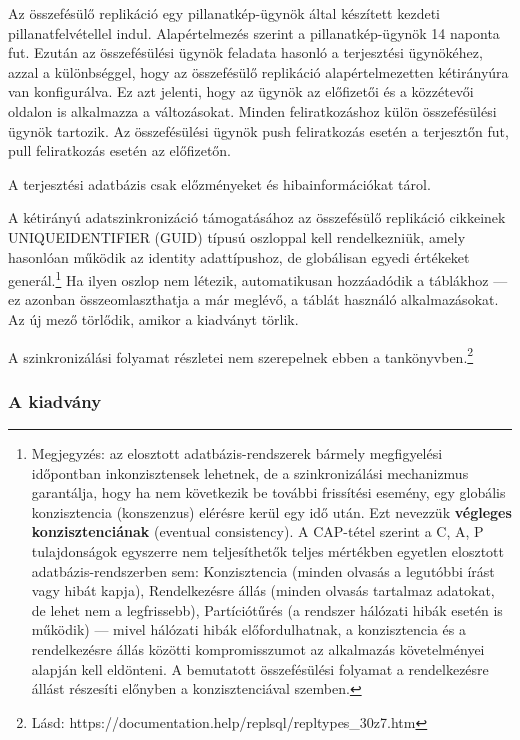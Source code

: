 \documentclass[
  magyar,
]{article}
\begin{document}
Az összefésülő replikáció egy pillanatkép-ügynök által készített kezdeti
pillanatfelvétellel indul. Alapértelmezés szerint a pillanatkép-ügynök
14 naponta fut. Ezután az összefésülési ügynök feladata hasonló a
terjesztési ügynökéhez, azzal a különbséggel, hogy az összefésülő
replikáció alapértelmezetten kétirányúra van konfigurálva. Ez azt
jelenti, hogy az ügynök az előfizetői és a közzétevői oldalon is
alkalmazza a változásokat. Minden feliratkozáshoz külön összefésülési
ügynök tartozik. Az összefésülési ügynök push feliratkozás esetén a
terjesztőn fut, pull feliratkozás esetén az előfizetőn.

A terjesztési adatbázis csak előzményeket és hibainformációkat tárol.

A kétirányú adatszinkronizáció támogatásához az összefésülő replikáció
cikkeinek UNIQUEIDENTIFIER (GUID) típusú oszloppal kell rendelkezniük,
amely hasonlóan működik az identity adattípushoz, de globálisan egyedi
értékeket generál.\footnote{Megjegyzés: az elosztott
  adatbázis-rendszerek bármely megfigyelési időpontban inkonzisztensek
  lehetnek, de a szinkronizálási mechanizmus garantálja, hogy ha nem
  következik be további frissítési esemény, egy globális konzisztencia
  (konszenzus) elérésre kerül egy idő után. Ezt nevezzük
  \textbf{végleges konzisztenciának} (eventual consistency). A CAP-tétel
  szerint a C, A, P tulajdonságok egyszerre nem teljesíthetők teljes
  mértékben egyetlen elosztott adatbázis-rendszerben sem: Konzisztencia
  (minden olvasás a legutóbbi írást vagy hibát kapja), Rendelkezésre
  állás (minden olvasás tartalmaz adatokat, de lehet nem a legfrissebb),
  Partíciótűrés (a rendszer hálózati hibák esetén is működik) --- mivel
  hálózati hibák előfordulhatnak, a konzisztencia és a rendelkezésre
  állás közötti kompromisszumot az alkalmazás követelményei alapján kell
  eldönteni. A bemutatott összefésülési folyamat a rendelkezésre állást
  részesíti előnyben a konzisztenciával szemben.} Ha ilyen oszlop nem
létezik, automatikusan hozzáadódik a táblákhoz --- ez azonban
összeomlaszthatja a már meglévő, a táblát használó alkalmazásokat. Az új
mező törlődik, amikor a kiadványt törlik.

A szinkronizálási folyamat részletei nem szerepelnek ebben a
tankönyvben.\footnote{Lásd:
  https://documentation.help/replsql/repltypes\_30z7.htm}

\subsubsection{A kiadvány}\label{a-kiadvuxe1ny}
\end{document}
